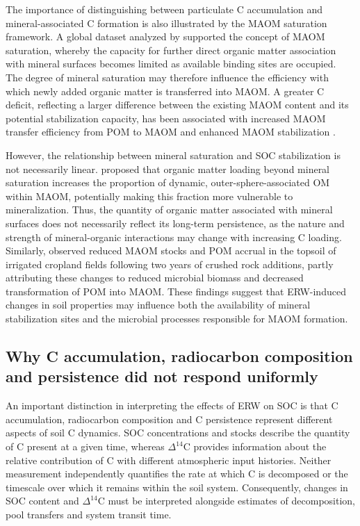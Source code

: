 \documentclass[preprint,12pt]{elsarticle}
\begin{document}
The importance of distinguishing between particulate C accumulation and mineral-associated C formation is also illustrated by the MAOM saturation framework. A global dataset analyzed by \citet{zhou2024global} supported the concept of MAOM saturation, whereby the capacity for further direct organic matter association with mineral surfaces becomes limited as available binding sites are occupied. The degree of mineral saturation may therefore influence the efficiency with which newly added organic matter is transferred into MAOM. A greater C deficit, reflecting a larger difference between the existing MAOM content and its potential stabilization capacity, has been associated with increased MAOM transfer efficiency from POM to MAOM and enhanced MAOM stabilization \citep{stewart2008saturation}.

However, the relationship between mineral saturation and SOC stabilization is not necessarily linear. \citep{sun2026tradeoff} proposed that organic matter loading beyond mineral saturation increases the proportion of dynamic, outer-sphere-associated OM within MAOM, potentially making this fraction more vulnerable to mineralization. Thus, the quantity of organic matter associated with mineral surfaces does not necessarily reflect its long-term persistence, as the nature and strength of mineral-organic interactions may change with increasing C loading. Similarly, \citep{sokol2024reduced} observed reduced MAOM stocks and POM accrual in the topsoil of irrigated cropland fields following two years of crushed rock additions, partly attributing these changes to reduced microbial biomass and decreased transformation of POM into MAOM. These findings suggest that ERW-induced changes in soil properties may influence both the availability of mineral stabilization sites and the microbial processes responsible for MAOM formation.

\subsection{Why C accumulation, radiocarbon composition and persistence did not respond uniformly}
\label{subsec:carbon_persistence}

An important distinction in interpreting the effects of ERW on SOC is that C accumulation, radiocarbon composition and C persistence represent different aspects of soil C dynamics. SOC concentrations and stocks describe the quantity of C present at a given time, whereas $\Delta^{14}$C provides information about the relative contribution of C with different atmospheric input histories. Neither measurement independently quantifies the rate at which C is decomposed or the timescale over which it remains within the soil system. Consequently, changes in SOC content and $\Delta^{14}$C must be interpreted alongside estimates of decomposition, pool transfers and system transit time.
\end{document}
